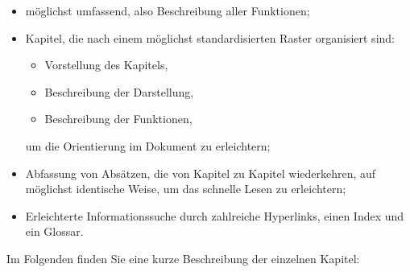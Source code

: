 \begin{itemize} 
	\item möglichst umfassend, also Beschreibung aller Funktionen;%
	\item Kapitel, die nach einem möglichst standardisierten Raster organisiert sind:%
		\begin{itemize}
		\item[\textopenbullet] Vorstellung des Kapitels,%
		\item[\textopenbullet] Beschreibung der Darstellung,%
		\item[\textopenbullet] Beschreibung der Funktionen,%
		\end{itemize}
	um die Orientierung im Dokument zu erleichtern;%
	\item Abfassung von Absätzen, die von Kapitel zu Kapitel wiederkehren, auf möglichst identische Weise, um das schnelle Lesen zu erleichtern;%
	\item Erleichterte Informationssuche durch zahlreiche \gls{Hyperlinks}, einen Index und ein Glossar.%
\end{itemize}

Im Folgenden finden Sie eine kurze Beschreibung der einzelnen Kapitel:%

